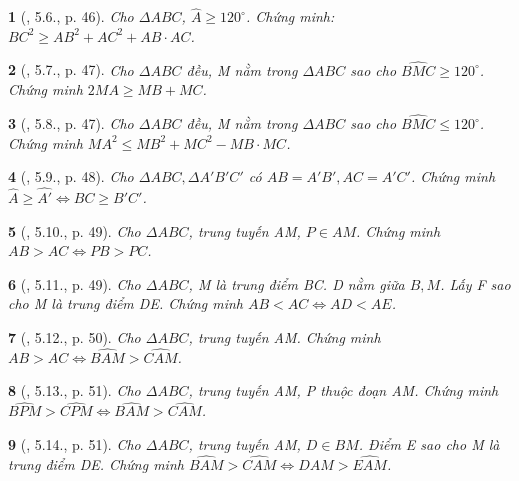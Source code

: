 \documentclass{article}
\newtheorem{baitoan}{}
\begin{document}
\begin{baitoan}[\cite{Hung_Mai_Toan_7_hinh_hoc}, 5.6., p. 46]
	Cho $\Delta ABC$, $\widehat{A}\ge120^\circ$. Chứng minh: $BC^2\ge AB^2 + AC^2 + AB\cdot AC$.
\end{baitoan}

\begin{baitoan}[\cite{Hung_Mai_Toan_7_hinh_hoc}, 5.7., p. 47]
	Cho $\Delta ABC$ đều, M nằm trong $\Delta ABC$ sao cho $\widehat{BMC}\ge120^\circ$. Chứng minh $2MA\ge MB + MC$.
\end{baitoan}

\begin{baitoan}[\cite{Hung_Mai_Toan_7_hinh_hoc}, 5.8., p. 47]
	Cho $\Delta ABC$ đều, M nằm trong $\Delta ABC$ sao cho $\widehat{BMC}\le120^\circ$. Chứng minh $MA^2\le MB^2 + MC^2 - MB\cdot MC$.
\end{baitoan}

\begin{baitoan}[\cite{Hung_Mai_Toan_7_hinh_hoc}, 5.9., p. 48]
	Cho $\Delta ABC,\Delta A'B'C'$ có $AB = A'B',AC = A'C'$. Chứng minh $\widehat{A}\ge\widehat{A'}\Leftrightarrow BC\ge B'C'$.
\end{baitoan}

\begin{baitoan}[\cite{Hung_Mai_Toan_7_hinh_hoc}, 5.10., p. 49]
	Cho $\Delta ABC$, trung tuyến AM, $P\in AM$. Chứng minh $AB > AC\Leftrightarrow PB > PC$.
\end{baitoan}

\begin{baitoan}[\cite{Hung_Mai_Toan_7_hinh_hoc}, 5.11., p. 49]
	Cho $\Delta ABC$, M là trung điểm BC. D nằm giữa $B,M$. Lấy F sao cho M là trung điểm DE. Chứng minh $AB < AC\Leftrightarrow AD < AE$.
\end{baitoan}

\begin{baitoan}[\cite{Hung_Mai_Toan_7_hinh_hoc}, 5.12., p. 50]
	Cho $\Delta ABC$, trung tuyến AM. Chứng minh $AB > AC\Leftrightarrow\widehat{BAM} > \widehat{CAM}$.
\end{baitoan}

\begin{baitoan}[\cite{Hung_Mai_Toan_7_hinh_hoc}, 5.13., p. 51]
	Cho $\Delta ABC$, trung tuyến AM, P thuộc đoạn AM. Chứng minh $\widehat{BPM} > \widehat{CPM}\Leftrightarrow \widehat{BAM} > \widehat{CAM}$.
\end{baitoan}

\begin{baitoan}[\cite{Hung_Mai_Toan_7_hinh_hoc}, 5.14., p. 51]
	Cho $\Delta ABC$, trung tuyến AM, $D\in BM$. Điểm E sao cho M là trung điểm DE. Chứng minh $\widehat{BAM} > \widehat{CAM}\Leftrightarrow\widehat{DAM} > \widehat{EAM}$.
\end{baitoan}
\end{document}
